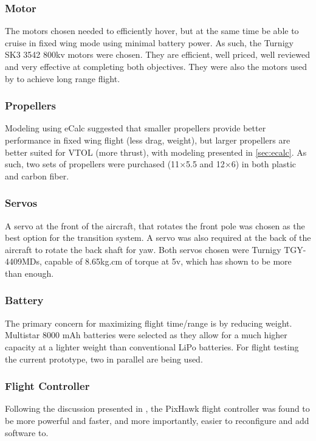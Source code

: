\subsubsection*{Motor}
The motors chosen needed to efficiently hover, but at the same time be able to cruise in fixed wing mode using minimal battery power. As such, the Turnigy SK3 3542 800kv motors were chosen. They are efficient, well priced, well reviewed and very effective at completing both objectives. They were also the motors used by  to achieve long range flight.
	
\subsubsection*{Propellers}
Modeling using eCalc suggested that smaller propellers provide better performance in fixed wing flight (less drag, weight), but larger propellers are better suited for VTOL (more thrust), with modeling presented in \ref{sec:ecalc}. As such, two sets of propellers were purchased (11$\times$5.5 and 12$\times$6) in both plastic and carbon fiber.
	
\subsubsection*{Servos}
A servo at the front of the aircraft, that rotates the front pole was chosen as the best option for the transition system. A servo was also required at the back of the aircraft to rotate the back shaft for yaw. Both servos chosen were Turnigy TGY-4409MDs, capable of 8.65kg.cm of torque at 5v, which has shown to be more than enough. 
		
\subsubsection*{Battery}
The primary concern for maximizing flight time/range is by reducing weight. Multistar 8000 mAh batteries were selected as they allow for a much higher capacity at a lighter weight than conventional LiPo batteries. For flight testing the current prototype, two in parallel are being used. 
	
\subsubsection*{Flight Controller}
Following the discussion presented in \cite{ref:controller_comparison}, the PixHawk flight controller was found to be more powerful and faster, and more importantly, easier to reconfigure and add software to.

